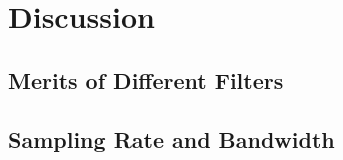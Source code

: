 \documentclass[12pt]{article}
\begin{document}
	\section{Discussion}
		\subsection{Merits of Different Filters}
		\subsection{Sampling Rate and Bandwidth}
	
\end{document}
